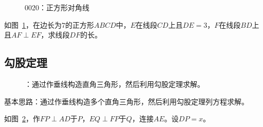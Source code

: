 

\begin{figure}[htbp]
  \centering
  \caption{0020：正方形对角线} \label{fig:0020}
\end{figure}

如图~\ref{fig:0020}，在边长为$7$的正方形$ABCD$中，$E$在线段$CD$上且$DE = 3$，$F$在线段$BD$上且$AF \perp EF$，求线段$DF$的长。


\subsection{勾股定理} \label{subsec:0020-pyth}

\begin{figure}[htbp]
  \centering
  \caption{：通过作垂线构造直角三角形，然后利用勾股定理求解。}
  \label{fig:0020-pyth}
\end{figure}

基本思路：通过作垂线构造多个直角三角形，然后利用勾股定理列方程求解。

如图~\ref{fig:0020-pyth}，作$FP \perp AD$于$P$，$EQ \perp FP$于$Q$，连接$AE$。设$DP = x$。

